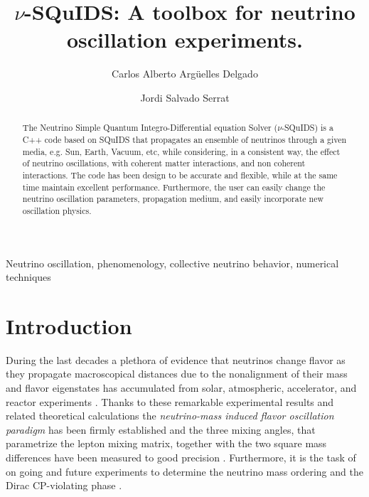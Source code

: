 \documentclass[3p,12pt,authoryear]{elsarticle}
\begin{document}
\begin{frontmatter}

\title{$\nu$-SQuIDS: A toolbox for neutrino oscillation experiments.}

\author[uw,wipac]{Carlos Alberto Arg\"uelles Delgado}
\author[uw,wipac]{Jordi Salvado Serrat}
\address[uw]{Department of Physics, University of Wisconsin, Madison, WI 53706, USA} 
\address[wipac]{Wisconsin IceCube Particle Astrophysics Center, Madison, WI 53703, USA}



\begin{abstract}
The Neutrino Simple Quantum Integro-Differential equation Solver ($\nu$-SQuIDS) is a C++ code based on SQuIDS that propagates an ensemble of neutrinos through a given media, e.g. Sun, Earth, Vacuum, etc, while considering, in a consistent way, the effect of neutrino oscillations, with coherent matter interactions, and non coherent interactions. The code has been design to be accurate and flexible, while at the same time maintain excellent performance. Furthermore, the user can easily change the neutrino oscillation parameters, propagation medium, and easily incorporate new oscillation physics. 
\end{abstract}

\begin{keyword}
Neutrino oscillation, phenomenology, collective neutrino behavior, numerical techniques
\end{keyword}

\end{frontmatter}

\hypersetup{linkcolor=black}
\tableofcontents
\hypersetup{linkcolor=blue}

\section{Introduction}
\label{sec:intro} 

During the last decades a plethora of evidence that neutrinos change flavor as they propagate macroscopical distances due to the nonalignment of their mass and flavor eigenstates has accumulated from solar, atmospheric, accelerator, and reactor experiments \citep{Mohapatra:qv,Gouvea:2013fj}. Thanks to these remarkable experimental results and related theoretical calculations the {\it neutrino-mass induced flavor oscillation paradigm} \citep{fukugita2003physics,Akhmedov:1999uz,Balantekin:2013kc} has been firmly established and the three mixing angles, that parametrize the lepton mixing matrix, together with the two square mass differences have been measured to good precision \citep{gonzalez2012global}. Furthermore, it is the task of on going and future experiments to determine the neutrino mass ordering and the Dirac CP-violating phase \citep{Agarwalla:2012mz}.
\end{document}
